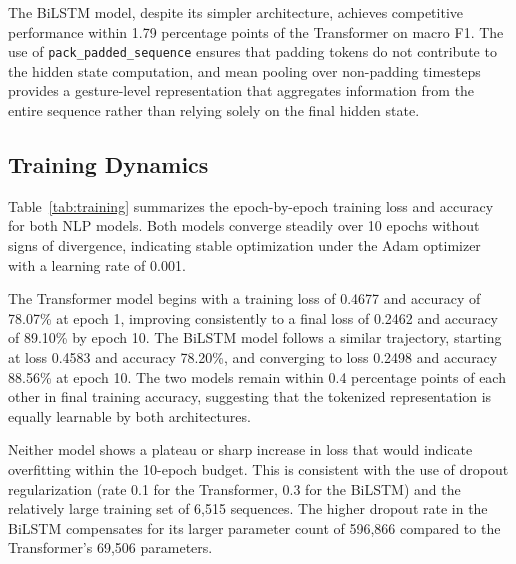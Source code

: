 \documentclass[conference]{IEEEtran}
\begin{document}
The BiLSTM model, despite its simpler architecture, achieves competitive performance within 1.79 percentage points of the Transformer on macro F1. The use of \texttt{pack\_padded\_sequence} ensures that padding tokens do not contribute to the hidden state computation, and mean pooling over non-padding timesteps provides a gesture-level representation that aggregates information from the entire sequence rather than relying solely on the final hidden state.

 \subsection{Training Dynamics}

Table~\ref{tab:training} summarizes the epoch-by-epoch training loss and 
accuracy for both NLP models. Both models converge steadily over 10 epochs 
without signs of divergence, indicating stable optimization under the Adam 
optimizer with a learning rate of 0.001.

The Transformer model begins with a training loss of 0.4677 and accuracy of 
78.07\% at epoch 1, improving consistently to a final loss of 0.2462 and 
accuracy of 89.10\% by epoch 10. The BiLSTM model follows a similar 
trajectory, starting at loss 0.4583 and accuracy 78.20\%, and converging to 
loss 0.2498 and accuracy 88.56\% at epoch 10. The two models remain within 
0.4 percentage points of each other in final training accuracy, suggesting 
that the tokenized representation is equally learnable by both architectures.

Neither model shows a plateau or sharp increase in loss that would indicate 
overfitting within the 10-epoch budget. This is consistent with the use of 
dropout regularization (rate 0.1 for the Transformer, 0.3 for the BiLSTM) 
and the relatively large training set of 6,515 sequences. The higher dropout 
rate in the BiLSTM compensates for its larger parameter count of 596,866 
compared to the Transformer's 69,506 parameters.
\end{document}
